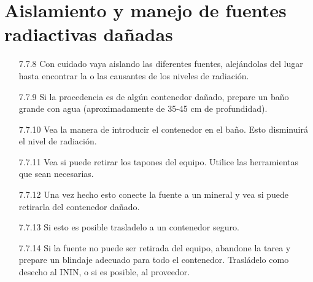\section*{Aislamiento y manejo de fuentes radiactivas dañadas}

\begin{itemize}
    \item[7.7.8] Con cuidado vaya aislando las diferentes fuentes, alejándolas del lugar hasta encontrar la o las causantes de los niveles de radiación.
    \item[7.7.9] Si la procedencia es de algún contenedor dañado, prepare un baño grande con agua (aproximadamente de 35-45 cm de profundidad).
    \item[7.7.10] Vea la manera de introducir el contenedor en el baño. Esto disminuirá el nivel de radiación.
    \item[7.7.11] Vea si puede retirar los tapones del equipo. Utilice las herramientas que sean necesarias.
    \item[7.7.12] Una vez hecho esto conecte la fuente a un mineral y vea si puede retirarla del contenedor dañado.
    \item[7.7.13] Si esto es posible trasladelo a un contenedor seguro.
    \item[7.7.14] Si la fuente no puede ser retirada del equipo, abandone la tarea y prepare un blindaje adecuado para todo el contenedor. Trasládelo como desecho al ININ, o si es posible, al proveedor.
\end{itemize}
